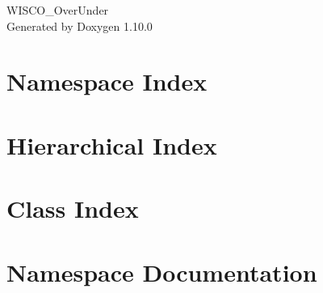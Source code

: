 \documentclass[twoside]{book}
\newcommand{\+}{\discretionary{\mbox{\scriptsize$\hookleftarrow$}}{}{}}
\newcommand{\clearemptydoublepage}{%
    \newpage{\pagestyle{empty}\cleardoublepage}%
  }
\begin{document}
  \raggedbottom
    \hypersetup{pageanchor=false,
                bookmarksnumbered=true,
                pdfencoding=unicode
               }
  \begin{titlepage}
  \vspace*{7cm}
  \begin{center}%
  {\Large WISCO\+\_\+\+Over\+Under}\\
  \vspace*{1cm}
  {\large Generated by Doxygen 1.10.0}\\
  \end{center}
  \end{titlepage}
  \clearemptydoublepage
  \tableofcontents
  \clearemptydoublepage
  \hypersetup{pageanchor=true}
\chapter{Namespace Index}

\chapter{Hierarchical Index}

\chapter{Class Index}

\chapter{Namespace Documentation}




















\end{document}
